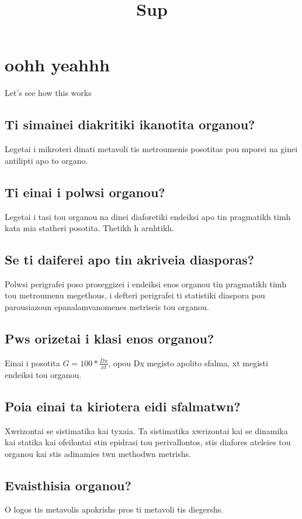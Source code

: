 \documentclass{article}
\title{Sup}
\date{}
\begin{document}
\maketitle

\section{oohh yeahhh}
Let's see how this works

\subsection{Ti simainei diakritiki ikanotita organou?}
Legetai i mikroteri dinati metavoli tis metroumenis posotitas pou mporei na ginei antilipti apo to organo.

\subsection{Ti einai i polwsi organou?}
Legetai i tasi tou organou na dinei diaforetiki endeiksi apo tin pragmatikh timh kata mia statheri posotita. Thetikh h arnhtikh.

\subsection{Se ti daiferei apo tin akriveia diasporas?}
Polwsi perigrafei poso proseggizei i endeiksi enos organou tin pragmatikh timh tou metroumenu megethous, i defteri perigrafei ti statistiki diaspora pou parousiazoun epanalamvanomenes metriseis tou organou.

\subsection{Pws orizetai i klasi enos organou?}
Einai i posotita $G=100*\frac{Dx}{xt}$, opou Dx megisto apolito sfalma, xt megisti endeiksi tou organou.

\subsection{Poia einai ta kiriotera eidi sfalmatwn?}
Xwrizontai se sistimatika kai tyxaia. Ta sistimatika xwrizontai kai se dinamika kai statika kai ofeilontai stin epidrasi tou perivallontos, stis diafores ateleies tou organou kai stis adinamies twn methodwn metrishs.

\subsection{Evaisthisia organou?}
O logos tis metavolis apokrishs pros ti metavoli tis diegershs.
\end{document}
